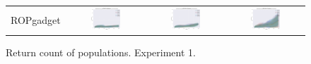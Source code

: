 \documentclass{article}
\begin{document}
\begin{landscape}
\begin{figure}[t]
\begin{center}
\begin{tabular}{c c c c}
    ROPgadget & \includegraphics[align=c,width=0.42\textwidth]{rc/e1/4} & \includegraphics[align=c,width=0.42\textwidth]{rc/e1/5} & \includegraphics[align=c,width=0.42\textwidth]{rc/e1/6} \\
\end{tabular}
\end{center}
\caption{Return count of populations. Experiment 1.}
\label{fig:rc/e1}
\end{figure}


\end{landscape}
\end{document}
